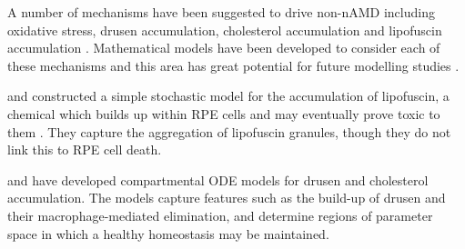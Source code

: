 \documentclass{article}
\begin{document}
A number of mechanisms have been suggested to drive non-nAMD including oxidative stress, drusen accumulation, cholesterol accumulation and lipofuscin accumulation \citep{Ambati_and_Fowler_2012,Handa_et_al_2019}. Mathematical models have been developed to consider each of these mechanisms and this area has great potential for future modelling studies \citep{Handa_et_al_2019,Luthert_et_al_2018}.

\citet{Mazzitello_et_al_2009} and \citet{Family_et_al_2010} constructed a simple stochastic model for the accumulation of lipofuscin, a chemical which builds up within RPE cells and may eventually prove toxic to them \citep{Sparrow_and_Boulton_2005}. They capture the aggregation of  lipofuscin granules, though they do not link this to RPE cell death.

\citet{Zekavat_et_al_2017} and \citet{Scheepers_et_al_2020} have developed compartmental ODE models for drusen and cholesterol accumulation. The models capture features such as the build-up of drusen and their macrophage-mediated elimination, and determine regions of parameter space in which a healthy homeostasis may be maintained.
\end{document}
